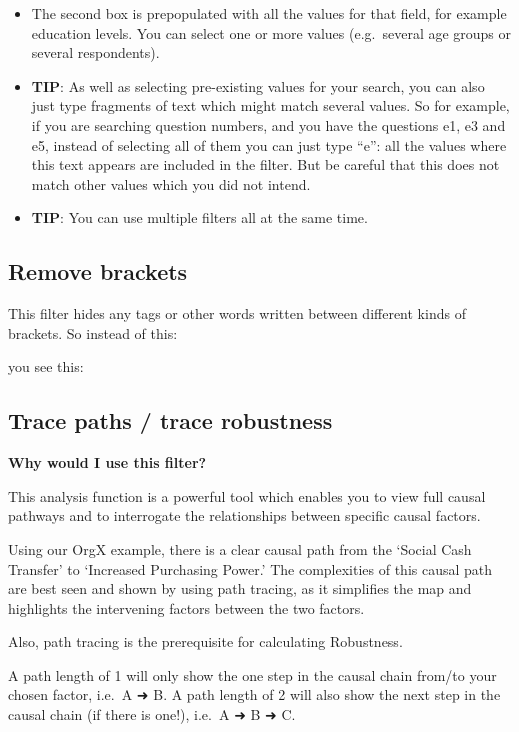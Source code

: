 \documentclass[
]{book}
\providecommand{\tightlist}{%
  \setlength{\itemsep}{0pt}\setlength{\parskip}{0pt}}
\begin{document}
\begin{itemize}
\tightlist
\item
  The second box is prepopulated with all the values for that field, for example education levels. You can select one or more values (e.g.~several age groups or several respondents).
\item
  \textbf{TIP}: As well as selecting pre-existing values for your search, you can also just type fragments of text which might match several values. So for example, if you are searching question numbers, and you have the questions e1, e3 and e5, instead of selecting all of them you can just type ``e'': all the values where this text appears are included in the filter. But be careful that this does not match other values which you did not intend.
\item
  \textbf{TIP}: You can use multiple filters all at the same time.
\end{itemize}

\hypertarget{remove-brackets}{%
\subsection{Remove brackets}\label{remove-brackets}}

This filter hides any tags or other words written between different kinds of brackets. So instead of this:

you see this:

\hypertarget{trace-paths-trace-robustness}{%
\subsection{Trace paths / trace robustness}\label{trace-paths-trace-robustness}}

\textbf{Why would I use this filter?}

This analysis function is a powerful tool which enables you to view full causal pathways and to interrogate the relationships between specific causal factors.

Using our OrgX example, there is a clear causal path from the `Social Cash Transfer' to `Increased Purchasing Power.' The complexities of this causal path are best seen and shown by using path tracing, as it simplifies the map and highlights the intervening factors between the two factors.

Also, path tracing is the prerequisite for calculating Robustness.

A path length of 1 will only show the one step in the causal chain from/to your chosen factor, i.e.~A ➜ B. A path length of 2 will also show the next step in the causal chain (if there is one!), i.e.~A ➜ B ➜ C.
\end{document}
